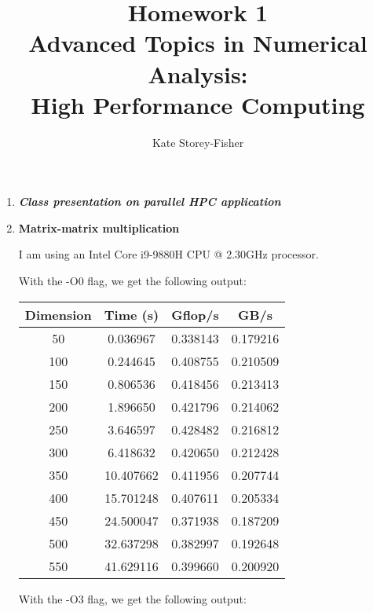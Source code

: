 \documentclass[12]{article}
\title{Homework 1 \\
 Advanced Topics in Numerical Analysis: \\
 High Performance Computing}
\author{Kate Storey-Fisher}
\begin{document}
\maketitle

\begin{enumerate}[label=\textbf{\arabic*}.]

\item \textbf{\textit{Class presentation on parallel HPC application}}

\item \textbf{Matrix-matrix multiplication}

    I am using an Intel Core i9-9880H CPU @ 2.30GHz processor.

    With the -O0 flag, we get the following output:
    
    \vspace{1em}
    \begin{tabular}{ c | c c c }         
	Dimension & Time (s) &  Gflop/s  & GB/s \\
	\hline
         50 &   0.036967 &   0.338143 &   0.179216 \\
       100 &   0.244645 &   0.408755 &   0.210509 \\
       150 &   0.806536 &   0.418456 &   0.213413 \\
       200 &   1.896650 &   0.421796 &   0.214062 \\
       250 &   3.646597 &   0.428482 &   0.216812 \\
       300 &   6.418632 &   0.420650 &   0.212428 \\
       350 &  10.407662 &   0.411956 &   0.207744 \\
       400 &  15.701248 &   0.407611 &   0.205334 \\
       450 &  24.500047 &   0.371938 &   0.187209 \\
       500 &  32.637298 &   0.382997 &   0.192648 \\
       550 &  41.629116 &   0.399660 &   0.200920 \\
   \end{tabular}
   \vspace{1em}
       
    With the -O3 flag, we get the following output:
    

\end{enumerate}
\end{document}
